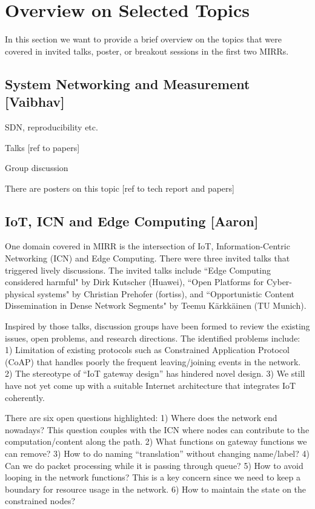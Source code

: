 \section{Overview on Selected Topics} \label{sec:content}

In this section we want to provide a brief overview on the topics that were
covered in invited talks, poster, or breakout sessions in the first two MIRRs.


\subsection{System Networking and Measurement [Vaibhav]}

SDN, reproducibility etc.

Talks [ref to papers]

Group discussion

There are posters on this topic [ref to tech report and papers]


\subsection{IoT, ICN and Edge Computing [Aaron]}

One domain covered in MIRR is the intersection of IoT, Information-Centric
Networking (ICN) and Edge Computing. There were three invited talks that triggered
lively discussions. The invited talks include
``Edge Computing considered harmful" by Dirk Kutscher (Huawei),
``Open Platforms for Cyber-physical systems" by Christian Prehofer (fortiss),
and ``Opportunistic Content Dissemination in Dense Network Segments"
by Teemu Kärkkäinen (TU Munich).

Inspired by those talks, discussion groups
have been formed to review the existing issues, open problems, and
research directions. The identified problems include: 1) Limitation
of existing protocols such as Constrained Application Protocol (CoAP) that
handles poorly the frequent leaving/joining events in the network. 2) The
stereotype of ``IoT gateway design'' has hindered novel design. 3) We still
have not yet come up with a suitable Internet architecture that integrates
IoT coherently.

There are six open questions highlighted: 1) Where does the network
end nowadays? This question couples
with the ICN where nodes can contribute to the computation/content along
the path. 2) What functions on gateway functions we can remove? 3) How to do
naming ``translation'' without changing name/label? 4) Can we do packet
processing while it is passing through queue? 5) How to avoid looping in
the network functions? This is a key concern since we need to keep a
boundary for resource usage in the network. 6) How to maintain the state on
the constrained nodes?


